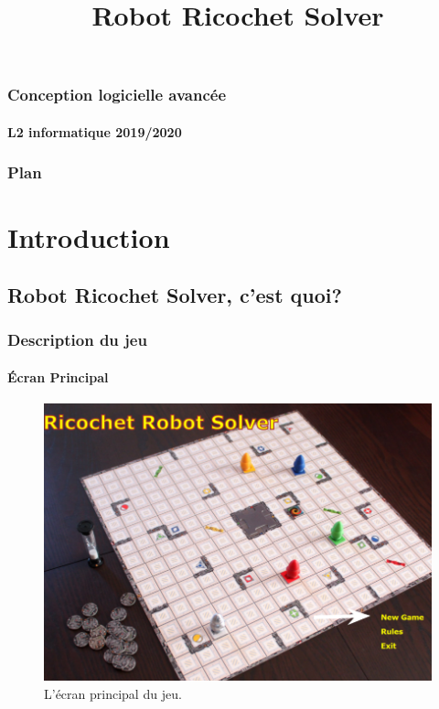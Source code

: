 \documentclass[t]{beamer}
\title{Robot Ricochet Solver}
\author[]{SI-MOHAMMED Sonia-Taous \\ BOUAOUD Malik \\ AIT KHEDDACHE Wissam \\ SINI Lynda \\ CUQUEMELLE Mathieu \\[\baselineskip] \small{{\color{kuviolet} Encadré par :}
  \and \\ M.BONNET Gregory \\ M.CHATEL Romain \\ M.SASSI Taoufik }}
\begin{document}
\begin{frame}
\frametitle{Conception logicielle avancée}
\framesubtitle{L2 informatique 2019/2020}
\titlepage
\end{frame}

\begin{frame} 
\frametitle{Plan}
\tableofcontents
\end{frame}

\section{Introduction}
\subsection{Robot Ricochet Solver, c'est quoi?}
\begin{frame}
\frametitle{Description du jeu}
\framesubtitle{Écran Principal}
\begin{center}
\begin{figure}[h!]
\centerline{\includegraphics[scale=0.35]{ecranPrincipal.png}}
\caption{L'écran principal du jeu.}
\end{figure}
\end{center}
\end{frame}
\end{document}
